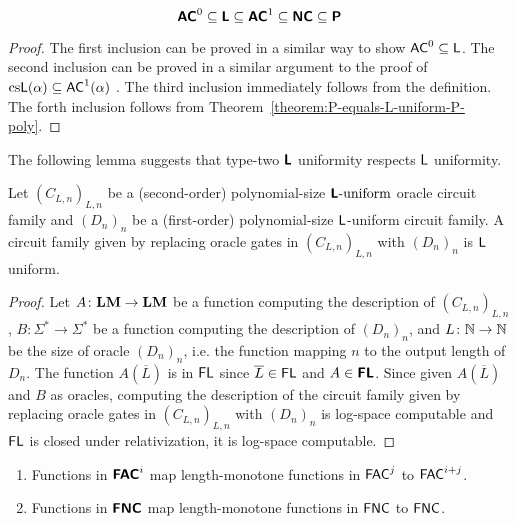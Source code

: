 \documentclass[envcountsame,orivec,oribibl]{llncs}
\begin{document}
\begin{theorem}
\label{theorem:inclusion}
\begin{equation}
 \text{\bfseries \sffamily \upshape AC}^0
 \subseteq \text{\bfseries \sffamily \upshape L} 
 \subseteq \text{\bfseries \sffamily \upshape AC}^1
 \subseteq \text{\bfseries \sffamily \upshape NC}
 \subseteq \text{\bfseries \sffamily \upshape P}
\end{equation}
\end{theorem}

\begin{proof}
 The first inclusion can be proved in a similar way
 to show $\mathsf{AC}^0 \subseteq \mathsf{L}$.
 The second inclusion can be proved in a similar argument to 
 the proof of $\text{cs}\mathsf{L}(\alpha) \subseteq \mathsf{AC}^1(\alpha)$
 \cite{aehlig2007relativizing}.
 The third inclusion immediately follows from the definition.
 The forth inclusion follows from Theorem~\ref{theorem:P-equals-L-uniform-P-poly}.
\end{proof}


The following lemma suggests that type-two $\text{\bfseries \sffamily \upshape L}$ uniformity respects
$\mathsf{L}$ uniformity.
\begin{lemma}
 Let $(C_{L,n})_{L,n}$ be a (second-order) polynomial-size $\text{\bfseries \sffamily \upshape L}\text{-uniform}$ oracle circuit family
 and $(D_n)_n$ be a (first-order) polynomial-size $\mathsf{L}$-uniform circuit family.
 A circuit family given by replacing oracle gates in $(C_{L,n})_{L,n}$ with
 $(D_n)_n$ is $\mathsf{L}$ uniform.
\end{lemma}

\begin{proof}
 Let $A \colon \mathbf{LM} \to \mathbf{LM}$ be a function computing the description of $(C_{L,n})_{L,n}$,
 $B \colon \Sigma^* \to \Sigma^*$ be a function computing the description of $(D_n)_n$, and
 $L \colon \mathbb N \to \mathbb N$ be the size of oracle $(D_n)_n$, i.e.
 the function mapping $n$ to the output length of $D_n$.
 The function $A(\overline{L})$ is in $\mathsf{FL}$ since $\overline{L} \in \mathsf{FL}$ and $A \in \text{\bfseries \sffamily \upshape FL}$.
 Since given $A(\overline{L})$ and $B$ as oracles,
 computing the description of the circuit family given by replacing oracle
 gates in $(C_{L,n})_{L,n}$ with $(D_n)_n$ is log-space computable
 and $\mathsf{FL}$ is closed under relativization,
 it is log-space computable.
\end{proof}

\begin{corollary}
\mbox{}
\begin{enumerate}
 \item Functions in $\text{\bfseries \sffamily \upshape FAC}^i$ 
       map length-monotone functions in $\mathsf{FAC}^j$ 
       to $\mathsf{FAC}^{i+j}$.
 \item Functions in $\text{\bfseries \sffamily \upshape FNC}$
       map length-monotone functions in $\mathsf{FNC}$ 
       to $\mathsf{FNC}$.
\end{enumerate}
\end{corollary}
\end{document}
